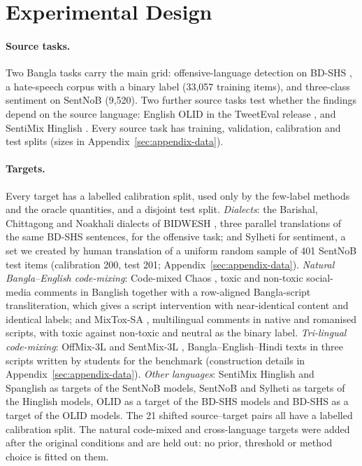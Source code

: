\section{Experimental Design}
\label{sec:experimental-design}

\paragraph{Source tasks.}
Two Bangla tasks carry the main grid: offensive-language detection on BD-SHS \citep{romim2022bdshs}, a hate-speech corpus with a
binary label (33{,}057 training items), and three-class sentiment on SentNoB \citep{islam2021sentnob} (9{,}520). Two further source
tasks test whether the findings depend on the source language: English OLID \citep{zampieri2019olid} in the TweetEval
release \citep{barbieri2020tweeteval}, and SentiMix Hinglish \citep{patwa2020sentimix}. Every source task has
training, validation, calibration and test splits (sizes in Appendix~\ref{sec:appendix-data}).

\paragraph{Targets.}
Every target has a labelled calibration split, used only by the few-label methods and the oracle quantities, and a
disjoint test split.
\emph{Dialects}: the Barishal, Chittagong and Noakhali dialects of BIDWESH \citep{bidwesh}, three parallel translations
of the same BD-SHS sentences, for the offensive task; and Sylheti for sentiment, a set we created by human translation of a uniform random
sample of 401 SentNoB test items (calibration 200, test 201; Appendix~\ref{sec:appendix-data}).
\emph{Natural Bangla--English code-mixing}: Code-mixed Chaos \citep{codemixedchaos}, toxic and non-toxic social-media
comments in Banglish together with a row-aligned Bangla-script transliteration, which gives a script intervention with
near-identical content and identical labels; and MixTox-SA \citep{mixtox}, multilingual comments in native and romanised scripts, with
toxic against non-toxic and neutral as the binary label.
\emph{Tri-lingual code-mixing}: OffMix-3L \citep{goswami2023offmix} and SentMix-3L \citep{raihan2023sentmix},
Bangla--English--Hindi texts in three scripts written by students for the benchmark (construction details in
Appendix~\ref{sec:appendix-data}).
\emph{Other languages}: SentiMix Hinglish and Spanglish as targets of the SentNoB models, SentNoB and Sylheti as targets
of the Hinglish models, OLID as a target of the BD-SHS models and BD-SHS as a target of the OLID models.
The 21 shifted source--target pairs all have a labelled calibration split. The natural code-mixed and cross-language
targets were added after the original conditions and are held out: no prior, threshold or method choice is fitted on
them.

